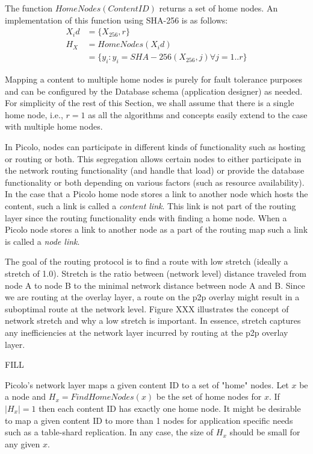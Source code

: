 The function \(HomeNodes(ContentID)\) returns a set of home nodes. An implementation of this function using SHA-256 is as follows:
\begin{align}
    X_id &= \{X_{256}, r\} \\
    H_X &= HomeNodes(X_id) \\
        &= \{ y_i : y_i = SHA-256(X_{256}, j) \forall j = 1 .. r\}
\end{align}

Mapping a content to multiple home nodes is purely for fault tolerance purposes and can be configured by the Database
schema (application designer) as needed. For simplicity of the rest of this Section, we shall assume that there is a
single home node, i.e., \( r = 1\) as all the algorithms and concepts easily extend to the case with multiple home
nodes.

In Picolo, nodes can participate in different kinds of functionality such as hosting or routing or both. This
segregation allows certain nodes to either participate in the network routing functionality (and handle that load) or
provide the database functionality or both depending on various factors (such as resource availability). In the case
that a Picolo home node stores a link to another node which hosts the content, such a link is called a {\em content
link}. This link is not part of the routing layer since the routing functionality ends with finding a home node. When a
Picolo node stores a link to another node as a part of the routing map such a link is called a {\em node link}.

The goal of the routing protocol is to find a route with low stretch (ideally a stretch of 1.0). Stretch is the ratio
between (network level) distance traveled from node A to node B to the minimal network distance between node A and B.
Since we are routing at the overlay layer, a route on the p2p overlay might result in a suboptimal route at the network
level. Figure XXX illustrates the concept of network stretch and why a low stretch is important. In essence, stretch
captures any inefficiencies at the network layer incurred by routing at the p2p overlay layer.

FILL

Picolo's network layer maps a given content ID to a set of "home" nodes. Let \(x\) be a node and \(H_x =
FindHomeNodes(x) \) be the set of home nodes for \(x\). If \( |H_x| = 1\) then each content ID has exactly one home
node. It might be desirable to map a given content ID to more than 1 nodes for application specific needs such as a
table-shard replication. In any case, the size of \( H_x \) should be small for any given \(x\).


